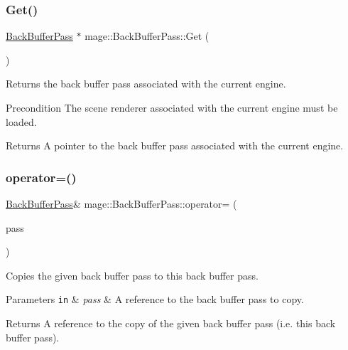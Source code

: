\subsubsection{\texorpdfstring{Get()}{Get()}}
{\footnotesize\ttfamily \hyperlink{classmage_1_1_back_buffer_pass}{Back\+Buffer\+Pass} $\ast$ mage\+::\+Back\+Buffer\+Pass\+::\+Get (\begin{DoxyParamCaption}{ }\end{DoxyParamCaption})\hspace{0.3cm}{\ttfamily [static]}}

Returns the back buffer pass associated with the current engine.

\begin{DoxyPrecond}{Precondition}
The scene renderer associated with the current engine must be loaded. 
\end{DoxyPrecond}
\begin{DoxyReturn}{Returns}
A pointer to the back buffer pass associated with the current engine. 
\end{DoxyReturn}
\hypertarget{classmage_1_1_back_buffer_pass_a77c804349e3f96c5d9dbd16cb421fbb6}{}\label{classmage_1_1_back_buffer_pass_a77c804349e3f96c5d9dbd16cb421fbb6} 
\subsubsection{\texorpdfstring{operator=()}{operator=()}\hspace{0.1cm}{\footnotesize\ttfamily [1/2]}}
{\footnotesize\ttfamily \hyperlink{classmage_1_1_back_buffer_pass}{Back\+Buffer\+Pass}\& mage\+::\+Back\+Buffer\+Pass\+::operator= (\begin{DoxyParamCaption}\item[{const \hyperlink{classmage_1_1_back_buffer_pass}{Back\+Buffer\+Pass} \&}]{pass }\end{DoxyParamCaption})\hspace{0.3cm}{\ttfamily [delete]}}

Copies the given back buffer pass to this back buffer pass.


\begin{DoxyParams}[1]{Parameters}
\mbox{\tt in}  & {\em pass} & A reference to the back buffer pass to copy. \\
\hline
\end{DoxyParams}
\begin{DoxyReturn}{Returns}
A reference to the copy of the given back buffer pass (i.\+e. this back buffer pass). 
\end{DoxyReturn}
\hypertarget{classmage_1_1_back_buffer_pass_aeaba028d1e576630817059b3f5a833c4}{}\label{classmage_1_1_back_buffer_pass_aeaba028d1e576630817059b3f5a833c4} 
